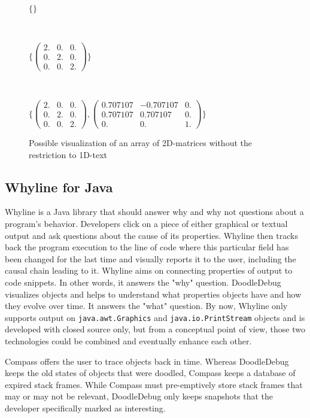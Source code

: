 \documentclass[english]{acm_proc_article-sp}
\begin{document}
\begin{figure}[h]
\raggedright
	$\{\}$
	\begin{verbatim}
	
	\end{verbatim}
	$\{\begin{pmatrix}
	2. & 0. & 0. \\
	0. & 2. & 0. \\
	0. & 0. & 2.
	\end{pmatrix}\}$
	\begin{verbatim}
	
	\end{verbatim}
	$\{\begin{pmatrix}
	2. & 0. & 0. \\
	0. & 2. & 0. \\
	0. & 0. & 2.
	\end{pmatrix},
	\begin{pmatrix}
	0.707107 & -0.707107 & 0. \\
	0.707107 & 0.707107 & 0. \\
	0. & 0. & 1.
	\end{pmatrix}\}$
	\caption[Ideal nesting of 2D-matrix array]{Possible visualization of an array of 2D-matrices without the restriction to 1D-text}
	\label{nested-matrix-idea}
\end{figure}

\subsection{Whyline for Java}
Whyline\cite{Ko04a} is a Java library that should answer why and why not questions about a program's behavior. Developers  click on a piece of either graphical or textual output and ask questions about the cause of its properties. Whyline then tracks back the program execution to the line of code where this particular field has been changed for the last time and visually reports it to the user, including the causal chain leading to it. Whyline aims on connecting properties of output to code snippets. In other words, it answers the "why" question. DoodleDebug visualizes objects and helps to understand what properties objects have and how they evolve over time. It answers the "what" question. By now, Whyline only supports output on \verb-java.awt.Graphics- and \verb-java.io.PrintStream- objects and is developed with closed source only, but from a conceptual point of view, those two technologies could be combined and eventually enhance each other.

Compass\cite{Lien09a} offers the user to trace objects back in time. Whereas DoodleDebug keeps the old states of objects that were doodled, Compass keeps a database of expired stack frames. While Compass must pre-emptively store stack frames that may or may not be relevant, DoodleDebug only keeps snapshots that the developer specifically marked as interesting.
\end{document}
